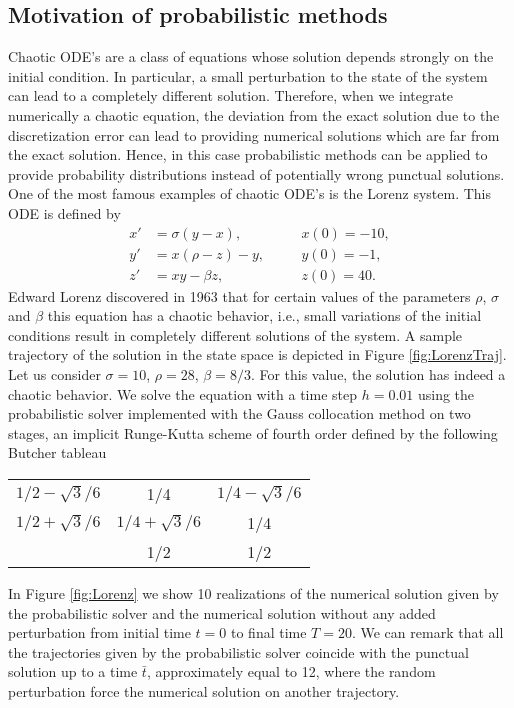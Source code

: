 \subsection{Motivation of probabilistic methods}

Chaotic ODE's are a class of equations whose solution depends strongly on the initial condition. In particular, a small perturbation to the state of the system can lead to a completely different solution. Therefore, when we integrate numerically a chaotic equation, the deviation from the exact solution due to the discretization error can lead to providing numerical solutions which are far from the exact solution. Hence, in this case probabilistic methods can be applied to provide probability distributions instead of potentially wrong punctual solutions.\\
One of the most famous examples of chaotic ODE's is the Lorenz system. This ODE is defined by
\begin{equation}\label{eq:Lorenz}
\begin{aligned}
x' &= \sigma(y - x), \quad &&x(0) = -10,\\
y' &= x(\rho - z) - y, \quad &&y(0) = -1,\\
z' &= xy - \beta z, \quad &&z(0) = 40.
\end{aligned}
\end{equation}
Edward Lorenz discovered in 1963 that for certain values of the parameters $\rho$, $\sigma$ and $\beta$ this equation has a chaotic behavior, i.e., small variations of the initial conditions result in completely different solutions of the system. A sample trajectory of the solution in the state space is depicted in Figure \ref{fig:LorenzTraj}. \\
Let us consider $\sigma = 10$, $\rho = 28$, $\beta = 8/3$. For this value, the solution has indeed a chaotic behavior. We solve the equation with a time step $h = 0.01$ using the probabilistic solver implemented with the Gauss collocation method on two stages, an implicit Runge-Kutta scheme of fourth order defined by the following Butcher tableau
\begin{center}
	\begin{tabular}{c|cc}
		$1/2-\sqrt{3}/6$ & 1/4 & $1/4-\sqrt{3}/6$ \\
		$1/2+\sqrt{3}/6$ & $1/4+\sqrt{3}/6$ & 1/4 \\
		\hline 
		& 1/2 & 1/2 
	\end{tabular}
\end{center} 
In Figure \ref{fig:Lorenz} we show 10 realizations of the numerical solution given by the probabilistic solver and the numerical solution without any added perturbation from initial time $t = 0$ to final time $T = 20$. We can remark that all the trajectories given by the probabilistic solver coincide with the punctual solution up to a time $\bar t$, approximately equal to 12, where the random perturbation force the numerical solution on another trajectory. 

